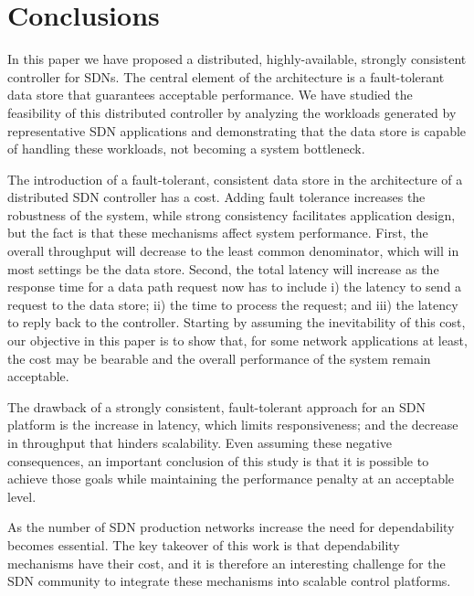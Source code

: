 \section{Conclusions}

In this paper we have proposed a distributed, highly-available, strongly consistent controller for SDNs.
The central element of the architecture is a fault-tolerant data store that guarantees acceptable performance.
We have studied the feasibility of this distributed controller by analyzing  the workloads generated by representative SDN applications and demonstrating that the data store is capable of handling these workloads, not becoming a system bottleneck.

The introduction of a fault-tolerant, consistent data store in the architecture of a distributed SDN controller has a cost.
Adding fault tolerance increases the robustness of the system, while strong consistency facilitates application design, but the fact is that these mechanisms affect system performance.
First, the overall throughput will decrease to the least common denominator, which will in most settings be the data store.
Second, the total latency will increase as the response time for a data path request now has to include i) the latency to send a request to the data store; ii) the time to process the request; and iii) the latency to reply back to the controller.
Starting by assuming the inevitability of this cost, our objective in this paper is to show that, for some network applications at least, the cost may be bearable and the overall performance of the system remain acceptable.


The drawback of a strongly consistent, fault-tolerant approach for an SDN platform is the increase in latency, which limits responsiveness; and the decrease in throughput that hinders scalability.
Even assuming these negative consequences, an important conclusion of this study is that it is possible to achieve those goals while maintaining the performance penalty at an acceptable level.

As the number of SDN production networks increase the need for dependability becomes essential. The key takeover of this work is that dependability mechanisms have their cost, and it is therefore an interesting challenge for the SDN community to integrate these mechanisms into scalable control platforms. 

